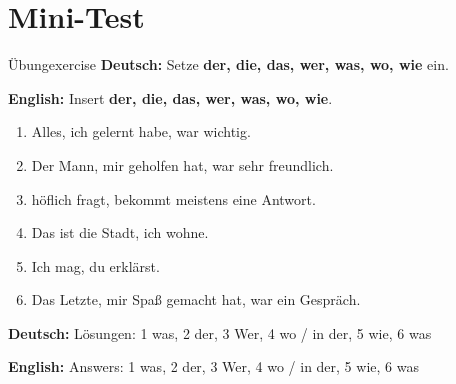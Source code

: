 \documentclass[a4paper,11pt]{article}
\newcommand{\GermanText}[1]{\textbf{Deutsch: }#1\par}
\newcommand{\EnglishText}[1]{{\small\color{SoftGray}\textbf{English: }#1\par}}
\begin{document}
\section{Mini-Test}

\begin{grammarentry}{Übung}{exercise}
\GermanText{Setze \textbf{der, die, das, wer, was, wo, wie} ein.}
\EnglishText{Insert \textbf{der, die, das, wer, was, wo, wie}.}

\begin{enumerate}
    \item Alles, \underline{\hspace{2cm}} ich gelernt habe, war wichtig.
    \item Der Mann, \underline{\hspace{2cm}} mir geholfen hat, war sehr freundlich.
    \item \underline{\hspace{2cm}} höflich fragt, bekommt meistens eine Antwort.
    \item Das ist die Stadt, \underline{\hspace{2cm}} ich wohne.
    \item Ich mag, \underline{\hspace{2cm}} du erklärst.
    \item Das Letzte, \underline{\hspace{2cm}} mir Spaß gemacht hat, war ein Gespräch.
\end{enumerate}

\GermanText{Lösungen: 1 was, 2 der, 3 Wer, 4 wo / in der, 5 wie, 6 was}
\EnglishText{Answers: 1 was, 2 der, 3 Wer, 4 wo / in der, 5 wie, 6 was}
\end{grammarentry}
\end{document}
